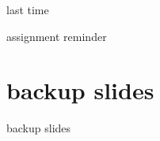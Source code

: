 \date{}
\title{}
\date{}

\begin{frame}
    \titlepage
\end{frame}

\begin{frame}{last time}
\end{frame}

\begin{frame}{assignment reminder}
\end{frame}







\section{backup slides}
\begin{frame}{backup slides}
\end{frame}


